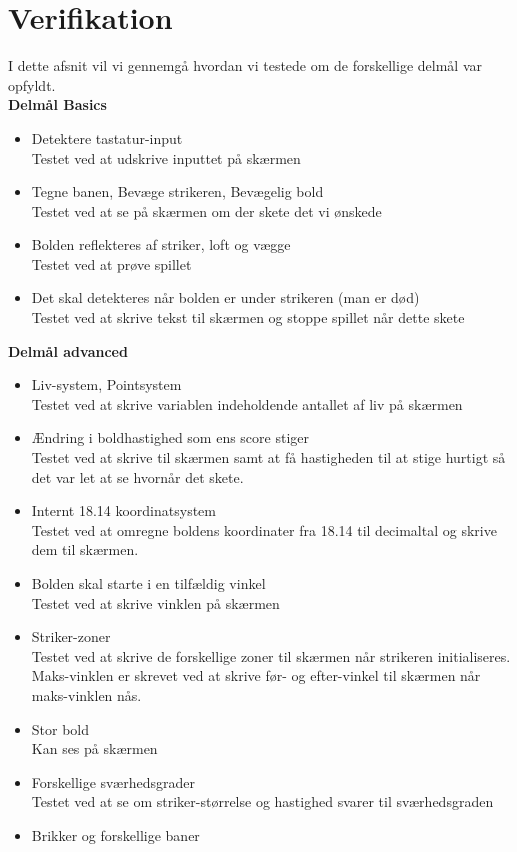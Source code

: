 \chapter{Verifikation}

I dette afsnit vil vi gennemgå hvordan vi testede om de forskellige delmål var opfyldt. \\


\textbf{Delmål Basics}
\begin{itemize}
\item Detektere tastatur-input 
\\Testet ved at udskrive inputtet på skærmen
\item Tegne banen, Bevæge strikeren, Bevægelig bold
\\Testet ved at se på skærmen om der skete det vi ønskede

\item Bolden reflekteres af striker, loft og vægge
\\Testet ved at prøve spillet
\item Det skal detekteres når bolden er under strikeren (man er død)
\\Testet ved at skrive tekst til skærmen og stoppe spillet når dette skete
\end{itemize}

\textbf{Delmål advanced}
\begin{itemize}
\item Liv-system, Pointsystem
\\Testet ved at skrive variablen indeholdende antallet af liv på skærmen

\item Ændring i boldhastighed som ens score stiger
\\ Testet ved at skrive til skærmen samt at få hastigheden til at stige hurtigt så det var let at se hvornår det skete. 

\item Internt 18.14 koordinatsystem 
\\ Testet ved at omregne boldens koordinater fra 18.14 til decimaltal og skrive dem til skærmen. 
\item Bolden skal starte i en tilfældig vinkel
\\ Testet ved at skrive vinklen på skærmen
\item Striker-zoner
\\ Testet ved at skrive de forskellige zoner til skærmen når strikeren initialiseres. Maks-vinklen er skrevet ved at skrive før- og efter-vinkel til skærmen når maks-vinklen nås. 
\item Stor bold
\\ Kan ses på skærmen
\item Forskellige sværhedsgrader
\\ Testet ved at se om striker-størrelse og hastighed svarer til sværhedsgraden
\item Brikker og forskellige baner


\end{itemize}	

